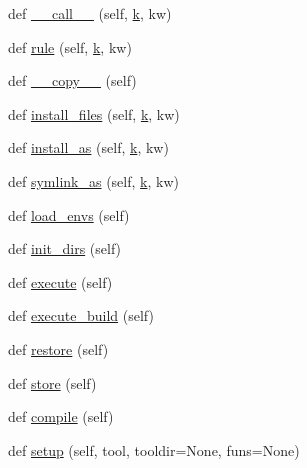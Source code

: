 \begin{DoxyCompactItemize}
\item 
def \hyperlink{classwaflib_1_1_build_1_1_build_context_ad658b3ed93230daaed1fd1d25488df4b}{\+\_\+\+\_\+call\+\_\+\+\_\+} (self, \hyperlink{rfft2d_test_m_l_8m_adc468c70fb574ebd07287b38d0d0676d}{k}, kw)
\item 
def \hyperlink{classwaflib_1_1_build_1_1_build_context_a46943e460fe05c7285a5e14154afab6c}{rule} (self, \hyperlink{rfft2d_test_m_l_8m_adc468c70fb574ebd07287b38d0d0676d}{k}, kw)
\item 
def \hyperlink{classwaflib_1_1_build_1_1_build_context_a4a0f871a711f02e9b65210633a14c6c2}{\+\_\+\+\_\+copy\+\_\+\+\_\+} (self)
\item 
def \hyperlink{classwaflib_1_1_build_1_1_build_context_ae579a92fd181e2d51337b641cb153439}{install\+\_\+files} (self, \hyperlink{rfft2d_test_m_l_8m_adc468c70fb574ebd07287b38d0d0676d}{k}, kw)
\item 
def \hyperlink{classwaflib_1_1_build_1_1_build_context_aba7c5ce03b3cd0d2e8c490d6470a6a9e}{install\+\_\+as} (self, \hyperlink{rfft2d_test_m_l_8m_adc468c70fb574ebd07287b38d0d0676d}{k}, kw)
\item 
def \hyperlink{classwaflib_1_1_build_1_1_build_context_a9b86ee2dd78a51893a2135970f9c6c9c}{symlink\+\_\+as} (self, \hyperlink{rfft2d_test_m_l_8m_adc468c70fb574ebd07287b38d0d0676d}{k}, kw)
\item 
def \hyperlink{classwaflib_1_1_build_1_1_build_context_aeac17c7231c914a04f552b68428f1d0a}{load\+\_\+envs} (self)
\item 
def \hyperlink{classwaflib_1_1_build_1_1_build_context_adb8b13740f058cd0e790340c5f6edf06}{init\+\_\+dirs} (self)
\item 
def \hyperlink{classwaflib_1_1_build_1_1_build_context_a8ef990b5bfdcc98634c6e1248398ecc2}{execute} (self)
\item 
def \hyperlink{classwaflib_1_1_build_1_1_build_context_ab150f731e961183d0acef3aa8c38d345}{execute\+\_\+build} (self)
\item 
def \hyperlink{classwaflib_1_1_build_1_1_build_context_a9222c95f85009e82a95a4a8cbe2df934}{restore} (self)
\item 
def \hyperlink{classwaflib_1_1_build_1_1_build_context_ae39e78bf8a49550451ed42b0467fa9d5}{store} (self)
\item 
def \hyperlink{classwaflib_1_1_build_1_1_build_context_af7d834423f8c49384edaf3dbaa8c912e}{compile} (self)
\item 
def \hyperlink{classwaflib_1_1_build_1_1_build_context_ad26165fd9d32fe212a94936da03066c1}{setup} (self, tool, tooldir=None, funs=None)

\end{DoxyCompactItemize}
